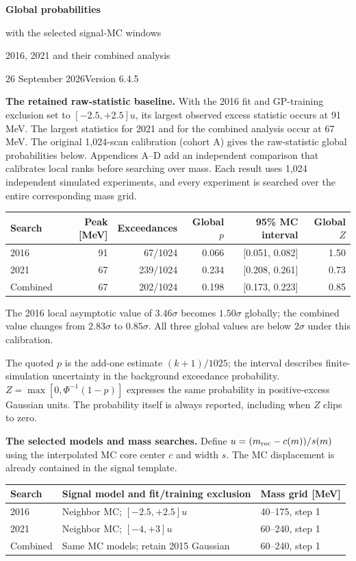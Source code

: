 \documentclass[11pt]{article}
\begin{document}
{\LARGE\bfseries Global probabilities\par with the selected signal-MC windows}\par
{\large 2016, 2021 and their combined analysis}\par
26 September 2026\hfill Version 6.4.5

\textbf{The retained raw-statistic baseline.} With the 2016 fit and GP-training exclusion set to $[-2.5,+2.5]u$, its largest observed excess statistic occurs at 91 MeV. The largest statistics for 2021 and for the combined analysis occur at 67 MeV. The original 1,024-scan calibration (cohort A) gives the raw-statistic global probabilities below. Appendices A--D add an independent comparison that calibrates local ranks before searching over mass. Each result uses 1,024 independent simulated experiments, and every experiment is searched over the entire corresponding mass grid.

\begin{center}\small\begin{tabular}{lrrrrr}\toprule
Search & Peak [MeV] & Exceedances & Global $p$ & 95\% MC interval & Global $Z$\\\midrule
2016 & 91 & 67/1024 & 0.066 & [0.051, 0.082] & 1.50\\
2021 & 67 & 239/1024 & 0.234 & [0.208, 0.261] & 0.73\\
Combined & 67 & 202/1024 & 0.198 & [0.173, 0.223] & 0.85\\
\bottomrule\end{tabular}\end{center}

The 2016 local asymptotic value of $3.46\sigma$ becomes $1.50\sigma$ globally; the combined value changes from $2.83\sigma$ to $0.85\sigma$. All three global values are below $2\sigma$ under this calibration.

The quoted $p$ is the add-one estimate $(k+1)/1025$; the interval describes finite-simulation uncertainty in the background exceedance probability. $Z=\max[0,\Phi^{-1}(1-p)]$ expresses the same probability in positive-excess Gaussian units. The probability itself is always reported, including when $Z$ clips to zero.

\textbf{The selected models and mass searches.} Define $u=(m_{\rm rec}-c(m))/s(m)$ using the interpolated MC core center $c$ and width $s$. The MC displacement is already contained in the signal template.

\begin{center}\small\begin{tabular}{lll}\toprule
Search & Signal model and fit/training exclusion & Mass grid [MeV]\\\midrule
2016 & Neighbor MC; $[-2.5,+2.5]u$ & 40--175, step 1\\
2021 & Neighbor MC; $[-4,+3]u$ & 60--240, step 1\\
Combined & Same MC models; retain 2015 Gaussian & 60--240, step 1\\\bottomrule
\end{tabular}\end{center}
\end{document}
